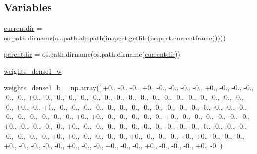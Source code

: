 \subsection*{Variables}
\begin{DoxyCompactItemize}
\item 
\hyperlink{namespacepybullet-gym_1_1pybulletgym_1_1examples_1_1roboschool-weights_1_1enjoy___t_f___half_cheetah_py_bullet_env__v0__2017may_aa3176231c946f54a08dfa6639d695f57}{currentdir} = os.\+path.\+dirname(os.\+path.\+abspath(inspect.\+getfile(inspect.\+currentframe())))
\item 
\hyperlink{namespacepybullet-gym_1_1pybulletgym_1_1examples_1_1roboschool-weights_1_1enjoy___t_f___half_cheetah_py_bullet_env__v0__2017may_aaaea02ad0d94754a0572c55d1c61e2c8}{parentdir} = os.\+path.\+dirname(os.\+path.\+dirname(\hyperlink{namespacepybullet-gym_1_1pybulletgym_1_1examples_1_1roboschool-weights_1_1enjoy___t_f___half_cheetah_py_bullet_env__v0__2017may_aa3176231c946f54a08dfa6639d695f57}{currentdir}))
\item 
\hyperlink{namespacepybullet-gym_1_1pybulletgym_1_1examples_1_1roboschool-weights_1_1enjoy___t_f___half_cheetah_py_bullet_env__v0__2017may_ae59de4917f8ae04537d1d9acf95a88ae}{weights\+\_\+dense1\+\_\+w}
\item 
\hyperlink{namespacepybullet-gym_1_1pybulletgym_1_1examples_1_1roboschool-weights_1_1enjoy___t_f___half_cheetah_py_bullet_env__v0__2017may_a0f87f2c17bbe80476f37c1ac45057d46}{weights\+\_\+dense1\+\_\+b} = np.\+array(\mbox{[} +0., -\/0., -\/0., +0., -\/0., -\/0., -\/0., -\/0., +0., -\/0., -\/0., -\/0., -\/0., -\/0., +0., -\/0., -\/0., -\/0., -\/0., -\/0., -\/0., -\/0., -\/0., -\/0., -\/0., -\/0., -\/0., -\/0., -\/0., -\/0., -\/0., -\/0., -\/0., +0., -\/0., +0., -\/0., -\/0., -\/0., -\/0., -\/0., -\/0., -\/0., -\/0., -\/0., -\/0., -\/0., -\/0., -\/0., -\/0., -\/0., -\/0., -\/0., -\/0., -\/0., -\/0., -\/0., -\/0., +0., +0., -\/0., -\/0., -\/0., -\/0., -\/0., +0., -\/0., -\/0., -\/0., -\/0., -\/0., -\/0., +0., -\/0., -\/0., -\/0., -\/0., +0., -\/0., -\/0., -\/0., -\/0., -\/0., -\/0., -\/0., -\/0., -\/0., -\/0., -\/0., -\/0., -\/0., -\/0., -\/0., -\/0., -\/0., -\/0., +0., +0., -\/0., -\/0., -\/0., -\/0., +0., -\/0., -\/0., -\/0., +0., +0., -\/0., -\/0., -\/0., +0., -\/0., -\/0., -\/0., -\/0., +0., -\/0., -\/0., +0., -\/0., -\/0., +0., -\/0., -\/0., -\/0., +0., -\/0.\mbox{]})

\end{DoxyCompactItemize}

